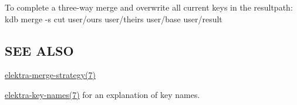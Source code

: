 To complete a three-\/way merge and overwrite all current keys in the {\ttfamily resultpath}\+: {\ttfamily kdb merge -\/s cut user/ours user/theirs user/base user/result}

\subsection*{S\+EE A\+L\+SO}


\begin{DoxyItemize}
\item \hyperlink{md_doc_help_elektra-merge-strategy_doc_help_elektra-merge-strategy_md}{elektra-\/merge-\/strategy(7)}
\item \hyperlink{md_doc_help_elektra-key-names_doc_help_elektra-key-names_md}{elektra-\/key-\/names(7)} for an explanation of key names. 
\end{DoxyItemize}